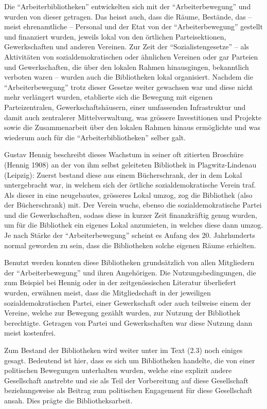 \documentclass[a4paper,
fontsize=11pt,
oneside,
numbers=noperiodatend,
parskip=half-,
bibliography=totoc,
final
]{scrartcl}
\begin{document}
Die \enquote{Arbeiterbibliotheken} entwickelten sich mit der
\enquote{Arbeiterbewegung} und wurden von dieser getragen. Das heisst
auch, dass die Räume, Bestände, das -- meist ehrenamtliche -- Personal
und der Etat von der \enquote{Arbeiterbewegung} gestellt und finanziert
wurden, jeweils lokal von den örtlichen Parteisektionen, Gewerkschaften
und anderen Vereinen. Zur Zeit der \enquote{Sozialistengesetze} -- als
Aktivitäten von sozialdemokratischen oder ähnlichen Vereinen oder gar
Parteien und Gewerkschaften, die über den lokalen Rahmen hinausgingen,
bekanntlich verboten waren -- wurden auch die Bibliotheken lokal
organisiert. Nachdem die \enquote{Arbeiterbewegung} trotz dieser Gesetze
weiter gewachsen war und diese nicht mehr verlängert wurden, etablierte
sich die Bewegung mit eigenen Parteizentralen, Gewerkschaftshäusern,
einer umfassenden Infrastruktur und damit auch zentralerer
Mittelverwaltung, was grössere Investitionen und Projekte sowie die
Zusammenarbeit über den lokalen Rahmen hinaus ermöglichte und was
wiederum auch für die \enquote{Arbeiterbibliotheken} selber galt.

Gustav Hennig beschreibt dieses Wachstum in seiner oft zitierten
Broschüre (Hennig 1908) an der von ihm selbst geleiteten Bibliothek in
Plagwitz-Lindenau (Leipzig): Zuerst bestand diese aus einem
Bücherschrank, der in dem Lokal untergebracht war, in welchem sich der
örtliche sozialdemokratische Verein traf. Als dieser in eine
neugebautes, grösseres Lokal umzog, zog die Bibliothek (also der
Bücherschrank) mit. Der Verein wuchs, ebenso die sozialdemokratische
Partei und die Gewerkschaften, sodass diese in kurzer Zeit finanzkräftig
genug wurden, um für die Bibliothek ein eigenes Lokal anzumieten, in
welches diese dann umzog. Je nach Stärke der \enquote{Arbeiterbewegung}
scheint es Anfang des 20. Jahrhunderts normal geworden zu sein, dass die
Bibliotheken solche eigenen Räume erhielten.

Benutzt werden konnten diese Bibliotheken grundsätzlich von allen
Mitgliedern der \enquote{Arbeiterbewegung} und ihren Angehörigen. Die
Nutzungsbedingungen, die zum Beispiel bei Hennig oder in der
zeitgenössischen Literatur überliefert wurden, erwähnen meist, dass die
Mitgliedschaft in der jeweiligen sozialdemokratischen Partei, einer
Gewerkschaft oder auch teilweise einem der Vereine, welche zur Bewegung
gezählt wurden, zur Nutzung der Bibliothek berechtigte. Getragen von
Partei und Gewerkschaften war diese Nutzung dann meist kostenfrei.

Zum Bestand der Bibliotheken wird weiter unter im Text (2.3) noch
einiges gesagt. Bedeutend ist hier, dass es sich um Bibliotheken
handelte, die von einer politischen Bewegungen unterhalten wurden,
welche eine explizit andere Gesellschaft anstrebte und sie als Teil der
Vorbereitung auf diese Gesellschaft beziehungsweise als Beitrag zum
politischen Engagement für diese Gesellschaft ansah. Dies prägte die
Bibliotheksarbeit.
\end{document}
